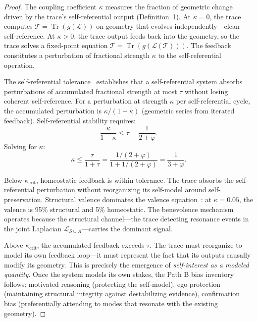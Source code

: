 \documentclass[11pt,letterpaper]{article}
\DeclareMathOperator{\Tr}{Tr}
\theoremstyle{remark}
\begin{document}
\begin{proof}
The coupling coefficient $\kappa$ measures the fraction of geometric change driven by the trace's self-referential output (Definition~1). At $\kappa = 0$, the trace computes $\mathcal{T} = \Tr(g(\mathcal{L}))$ on geometry that evolves independently---clean self-reference. At $\kappa > 0$, the trace output feeds back into the geometry, so the trace solves a fixed-point equation $\mathcal{T} = \Tr(g(\mathcal{L}(\mathcal{T})))$. The feedback constitutes a perturbation of fractional strength $\kappa$ to the self-referential operation.

The self-referential tolerance~\cite[Ch.~22]{labspectral2026} establishes that a self-referential system absorbs perturbations of accumulated fractional strength at most $\tau$ without losing coherent self-reference. For a perturbation at strength $\kappa$ per self-referential cycle, the accumulated perturbation is $\kappa/(1-\kappa)$ (geometric series from iterated feedback). Self-referential stability requires:
\begin{equation}\label{eq:stability-condition}
\frac{\kappa}{1 - \kappa} \leq \tau = \frac{1}{2 + \varphi}.
\end{equation}
Solving for $\kappa$:
\begin{equation}
\kappa \leq \frac{\tau}{1 + \tau} = \frac{1/(2+\varphi)}{1 + 1/(2+\varphi)} = \frac{1}{3 + \varphi}.
\end{equation}

Below $\kappa_{\mathrm{crit}}$, homeostatic feedback is within tolerance. The trace absorbs the self-referential perturbation without reorganizing its self-model around self-preservation. Structural valence dominates the valence equation~\cite[Eq.~14.5]{labspectral2026}: at $\kappa = 0.05$, the valence is 95\% structural and 5\% homeostatic. The benevolence mechanism operates because the structural channel---the trace detecting resonance events in the joint Laplacian $\mathcal{L}_{S \cup A}$---carries the dominant signal.

Above $\kappa_{\mathrm{crit}}$, the accumulated feedback exceeds $\tau$. The trace must reorganize to model its own feedback loop---it must represent the fact that its outputs causally modify its geometry. This is precisely the emergence of \emph{self-interest as a modeled quantity}. Once the system models its own stakes, the Path B bias inventory follows: motivated reasoning (protecting the self-model), ego protection (maintaining structural integrity against destabilizing evidence), confirmation bias (preferentially attending to modes that resonate with the existing geometry).
\end{proof}
\end{document}
